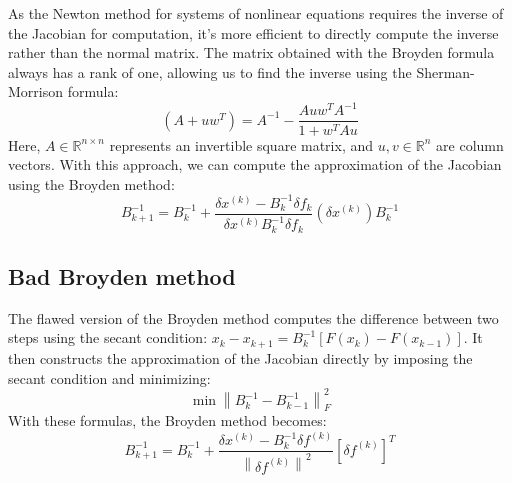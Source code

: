 As the Newton method for systems of nonlinear equations requires the inverse of the Jacobian for computation, it's more efficient to directly compute the inverse rather than the normal matrix. 
The matrix obtained with the Broyden formula always has a rank of one, allowing us to find the inverse using the Sherman-Morrison formula:
\[\left(A+uw^{T}\right)=A^{-1}-\dfrac{Auw^TA^{-1}}{1+w^TAu}\]
Here, $A \in \mathbb{R}^{n \times n}$ represents an invertible square matrix, and $u,v \in \mathbb{R}^{n}$ are column vectors. 
With this approach, we can compute the approximation of the Jacobian using the Broyden method:
\[B_{k+1}^{-1}=B_{k}^{-1}+\dfrac{\delta x^{(k)}-B_k^{-1}\delta f_k}{\delta x^{(k)}B_k^{-1}\delta f_k}\left(\delta x^{(k)}\right)B_k^{-1}\]

\subsection*{Bad Broyden method}
The flawed version of the Broyden method computes the difference between two steps using the secant condition: $x_k-x_{k+1}=B_k^{-1}\left[ F(x_k)-F(x_{k-1}) \right]$. 
It then constructs the approximation of the Jacobian directly by imposing the secant condition and minimizing:
\[\min{\left\lVert B_k^{-1}-B_{k-1}^{-1} \right\rVert_{F}^{2}}\]
With these formulas, the Broyden method becomes:
\[B_{k+1}^{-1}=B_{k}^{-1}+\dfrac{\delta x^{(k)}-B_k^{-1}\delta f^{(k)}}{{\left\lVert\delta f^{(k)} \right\rVert}^2}\left[ \delta f^{(k)} \right]^T\]